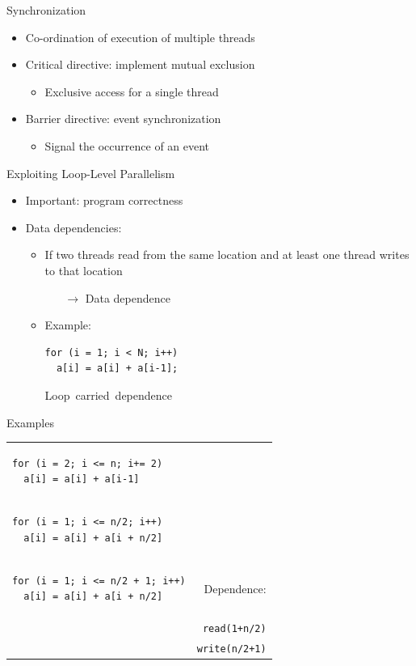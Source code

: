 \begin{frame}{Synchronization}
  \begin{itemize}
  \item Co-ordination of execution of multiple threads
  \item Critical directive: implement mutual exclusion
    \begin{itemize}
    \item Exclusive access for a single thread
    \end{itemize}
  \item Barrier directive: event synchronization
    \begin{itemize}
    \item Signal the occurrence of an event
    \end{itemize}
  \end{itemize}
\end{frame}

\begin{frame}[fragile]{Exploiting Loop-Level Parallelism}
  \begin{itemize}
  \item Important: program correctness
  \item Data dependencies:
    \begin{itemize}
    \item If two threads read from the same location and at least one
      thread writes to that location
      \begin{itemize}
      \item[$\rightarrow$] Data dependence
      \end{itemize}
    \item Example:
\begin{lstlisting}
for (i = 1; i < N; i++)
  a[i] = a[i] + a[i-1];
\end{lstlisting}
      \alert{Loop~carried~dependence}
    \end{itemize}
  \end{itemize}
\end{frame}

\begin{frame}[fragile]{Examples}
  \begin{tabular}{l r}
\begin{lstlisting}
for (i = 2; i <= n; i+= 2)
  a[i] = a[i] + a[i-1]
\end{lstlisting} & \pause\color{green}{No dependence}\pause \\[3em]
\begin{lstlisting}
for (i = 1; i <= n/2; i++)
  a[i] = a[i] + a[i + n/2]
\end{lstlisting} & \pause\color{green}{No dependence}\pause\\[3em]
\begin{lstlisting}
for (i = 1; i <= n/2 + 1; i++)
  a[i] = a[i] + a[i + n/2]
\end{lstlisting} & \pause\alert{Dependence:} \\
    & \alert{\lstinline!read(1+n/2)!} \\
    & \alert{\lstinline!write(n/2+1)!} \\
  \end{tabular}
\end{frame}


